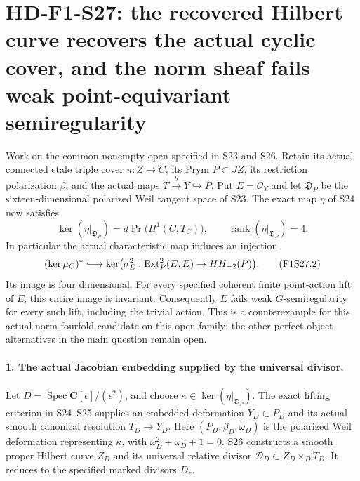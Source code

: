 \section[HD-F1-S27: recovery of the cover and four nonzero trace-kernel classes]{HD-F1-S27: the recovered Hilbert curve recovers the actual cyclic cover, and the norm sheaf fails weak point-equivariant semiregularity}
\label{sec:f1-norm-fourfold-recovered-cover}

Work on the common nonempty open specified in S23 and S26.
Retain its actual connected etale triple cover
$\pi:Z\to C$, its Prym $P\subset JZ$, its restriction
polarization $\beta$, and the actual maps
$T\xrightarrow{b}Y\hookrightarrow P$.
Put $E=\mathcal O_Y$ and let $\mathfrak D_P$ be the
sixteen-dimensional polarized Weil tangent space of S23.
The exact map $\eta$ of S24 now satisfies
\[
 \ker(\eta|_{\mathfrak D_P})
       =d\operatorname{Pr}\bigl(H^1(C,T_C)\bigr),
       \qquad \operatorname{rank}(\eta|_{\mathfrak D_P})=4.
 \tag{F1S27.1}
\]
In particular the actual characteristic map induces an
injection
\[
 (\ker\mu_C)^*\lhook\joinrel\longrightarrow
 \ker\bigl(\sigma_E^2:\operatorname{Ext}^2_P(E,E)
                                      \to HH_{-2}(P)\bigr).
 \tag{F1S27.2}
\]
Its image is four dimensional. For every specified coherent
finite point-action lift of $E$, this entire image is invariant.
Consequently $E$ fails weak $G$-semiregularity for every such
lift, including the trivial action. This is a counterexample
for this actual norm-fourfold candidate on this open family;
the other perfect-object alternatives in the main question
remain open.

\paragraph{1. The actual Jacobian embedding supplied by the universal divisor.}
Let $D=\operatorname{Spec}\mathbf C[\epsilon]/(\epsilon^2)$,
and choose $\kappa\in\ker(\eta|_{\mathfrak D_P})$.
The exact lifting criterion in S24--S25 supplies an embedded
deformation $Y_D\subset P_D$ and its actual smooth canonical
resolution $T_D\to Y_D$. Here $(P_D,\beta_D,\omega_D)$ is
the polarized Weil deformation representing $\kappa$, with
$\omega_D^2+\omega_D+1=0$.
S26 constructs a smooth proper Hilbert curve $Z_D$ and
its universal relative divisor
$\mathcal D_D\subset Z_D\times_D T_D$.
It reduces to the specified marked divisors $D_z$.

